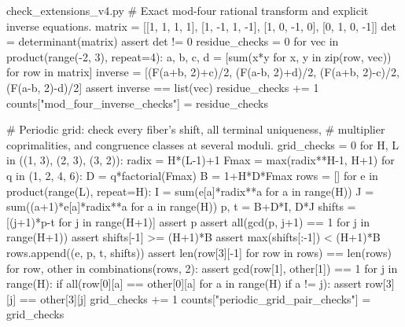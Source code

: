 \begin{filecontents*}[overwrite]{check_extensions_v4.py}
    # Exact mod-four rational transform and explicit inverse equations.
    matrix = [[1, 1, 1, 1], [1, -1, 1, -1], [1, 0, -1, 0], [0, 1, 0, -1]]
    det = determinant(matrix)
    assert det != 0
    residue_checks = 0
    for vec in product(range(-2, 3), repeat=4):
        a, b, c, d = [sum(x*y for x, y in zip(row, vec)) for row in matrix]
        inverse = [(F(a+b, 2)+c)/2, (F(a-b, 2)+d)/2,
                   (F(a+b, 2)-c)/2, (F(a-b, 2)-d)/2]
        assert inverse == list(vec)
        residue_checks += 1
    counts["mod_four_inverse_checks"] = residue_checks

    # Periodic grid: check every fiber's shift, all terminal uniqueness,
    # multiplier coprimalities, and congruence classes at several moduli.
    grid_checks = 0
    for H, L in ((1, 3), (2, 3), (3, 2)):
        radix = H*(L-1)+1
        Fmax = max(radix**H-1, H+1)
        for q in (1, 2, 4, 6):
            D = q*factorial(Fmax)
            B = 1+H*D*Fmax
            rows = []
            for e in product(range(L), repeat=H):
                I = sum(e[a]*radix**a for a in range(H))
                J = sum((a+1)*e[a]*radix**a for a in range(H))
                p, t = B+D*I, D*J
                shifts = [(j+1)*p-t for j in range(H+1)]
                assert p %
                assert all(gcd(p, j+1) == 1 for j in range(H+1))
                assert shifts[-1] >= (H+1)*B
                assert max(shifts[:-1]) < (H+1)*B
                rows.append((e, p, t, shifts))
            assert len({row[3][-1] for row in rows}) == len(rows)
            for row, other in combinations(rows, 2):
                assert gcd(row[1], other[1]) == 1
                for j in range(H):
                    if all(row[0][a] == other[0][a] for a in range(H) if a != j):
                        assert row[3][j] == other[3][j]
                grid_checks += 1
    counts["periodic_grid_pair_checks"] = grid_checks


\end{filecontents*}
